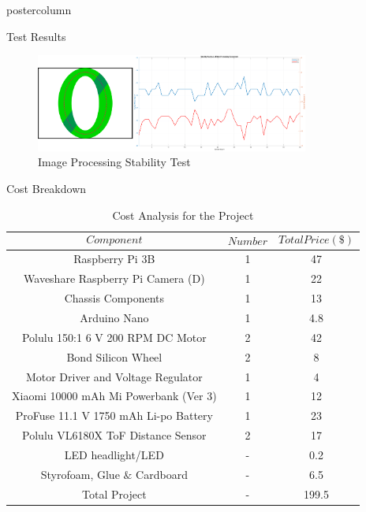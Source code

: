 \documentclass{beamer}
\begin{document}
\begin{frame}
\begin{columns}
\begin{column}{.5\textwidth}
\begin{beamercolorbox}[center]{postercolumn}
\begin{minipage}{.98\textwidth}
{\begin{myblock}{Test Results}
			
			\begin{figure}
				\centering
				\includegraphics[width=0.8\textwidth]{img/stabilityTestS}
				\caption{Image Processing Stability Test}
				\label{fig:stabTest}
			\end{figure}
				\-\vspace{-2cm}
					\end{myblock} \vspace{-0.4em}
					\begin{myblock}{Cost Breakdown}
						\begin{table}[H]
						\centering
						\caption{Cost Analysis for the Project}
						\begin{tabular}{c c c}
							$$Component$$ & $$Number$$ & $$Total Price (\$)$$  \\ \hline
							Raspberry Pi 3B & 1 & 47   \\ 
							Waveshare Raspberry Pi Camera (D) & 1 & 22   \\ 
							Chassis Components & 1 & 13   \\ 
							Arduino Nano & 1 &  4.8 \\ 
							Polulu 150:1 6 V 200 RPM DC Motor & 2 & 42 \\ 
							Bond Silicon Wheel & 2 & 8 \\ 
							Motor Driver and Voltage Regulator & 1 &  4 \\ 
							Xiaomi 10000 mAh Mi Powerbank (Ver 3) & 1 & 12 \\ 
							ProFuse 11.1 V 1750 mAh Li-po Battery  & 1 & 23 \\ 
							Polulu VL6180X ToF Distance Sensor & 2 & 17 \\
							LED headlight/LED & - & 0.2 \\ 
							Styrofoam, Glue $\&$ Cardboard & - & 6.5 \\ \hline
							Total Project & - & 199.5 
						\end{tabular} 
						\label{tab:cost}
					\end{table}
				\-\vspace{-1cm}
					\end{myblock} \vspace{-0.4em}
}
\end{minipage}
\end{beamercolorbox}
\end{column}
\end{columns}
\end{frame}
\end{document}
